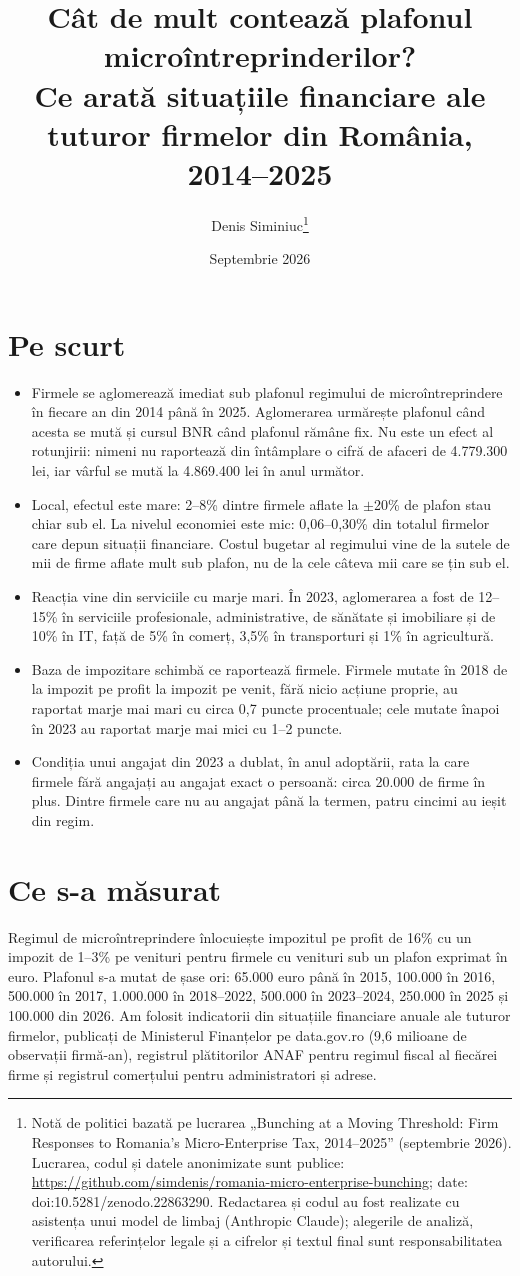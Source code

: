 \documentclass[11pt]{article}
\title{Cât de mult contează plafonul microîntreprinderilor?\\ \large Ce arată situațiile financiare ale tuturor firmelor din România, 2014--2025}
\author{Denis Siminiuc\thanks{Notă de politici bazată pe lucrarea „Bunching at a Moving Threshold: Firm Responses to Romania's Micro-Enterprise Tax, 2014--2025” (septembrie 2026). Lucrarea, codul și datele anonimizate sunt publice: \url{https://github.com/simdenis/romania-micro-enterprise-bunching}; date: doi:10.5281/zenodo.22863290. Redactarea și codul au fost realizate cu asistența unui model de limbaj (Anthropic Claude); alegerile de analiză, verificarea referințelor legale și a cifrelor și textul final sunt responsabilitatea autorului.}}
\date{Septembrie 2026}
\begin{document}
\maketitle

\section*{Pe scurt}

\begin{itemize}
\item Firmele se aglomerează imediat sub plafonul regimului de microîntreprindere în fiecare an din 2014 până în 2025. Aglomerarea urmărește plafonul când acesta se mută și cursul BNR când plafonul rămâne fix. Nu este un efect al rotunjirii: nimeni nu raportează din întâmplare o cifră de afaceri de 4.779.300 lei, iar vârful se mută la 4.869.400 lei în anul următor.
\item Local, efectul este mare: 2--8\% dintre firmele aflate la $\pm$20\% de plafon stau chiar sub el. La nivelul economiei este mic: 0,06--0,30\% din totalul firmelor care depun situații financiare. Costul bugetar al regimului vine de la sutele de mii de firme aflate mult sub plafon, nu de la cele câteva mii care se țin sub el.
\item Reacția vine din serviciile cu marje mari. În 2023, aglomerarea a fost de 12--15\% în serviciile profesionale, administrative, de sănătate și imobiliare și de 10\% în IT, față de 5\% în comerț, 3,5\% în transporturi și 1\% în agricultură.
\item Baza de impozitare schimbă ce raportează firmele. Firmele mutate în 2018 de la impozit pe profit la impozit pe venit, fără nicio acțiune proprie, au raportat marje mai mari cu circa 0,7 puncte procentuale; cele mutate înapoi în 2023 au raportat marje mai mici cu 1--2 puncte.
\item Condiția unui angajat din 2023 a dublat, în anul adoptării, rata la care firmele fără angajați au angajat exact o persoană: circa 20.000 de firme în plus. Dintre firmele care nu au angajat până la termen, patru cincimi au ieșit din regim.
\end{itemize}

\section{Ce s-a măsurat}

Regimul de microîntreprindere înlocuiește impozitul pe profit de 16\% cu un impozit de 1--3\% pe venituri pentru firmele cu venituri sub un plafon exprimat în euro. Plafonul s-a mutat de șase ori: 65.000 euro până în 2015, 100.000 în 2016, 500.000 în 2017, 1.000.000 în 2018--2022, 500.000 în 2023--2024, 250.000 în 2025 și 100.000 din 2026. Am folosit indicatorii din situațiile financiare anuale ale tuturor firmelor, publicați de Ministerul Finanțelor pe data.gov.ro (9,6 milioane de observații firmă-an), registrul plătitorilor ANAF pentru regimul fiscal al fiecărei firme și registrul comerțului pentru administratori și adrese.
\end{document}
